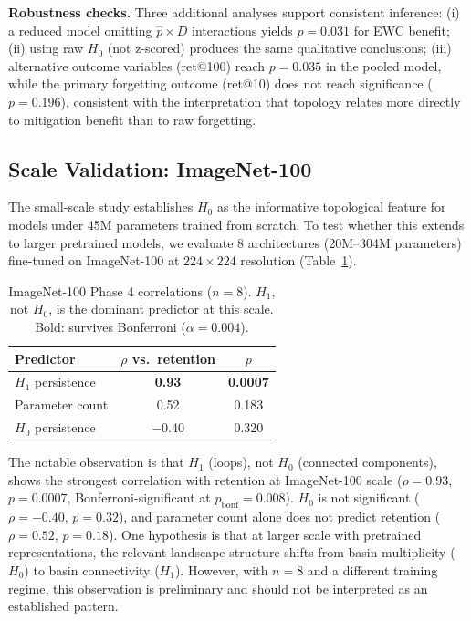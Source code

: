 \documentclass{article}
\begin{document}
\textbf{Robustness checks.} Three additional analyses support consistent inference: (i) a reduced model omitting $\hat{p} \times D$ interactions yields $p = 0.031$ for EWC benefit; (ii) using raw $H_0$ (not z-scored) produces the same qualitative conclusions; (iii) alternative outcome variables (ret@100) reach $p = 0.035$ in the pooled model, while the primary forgetting outcome (ret@10) does not reach significance ($p = 0.196$), consistent with the interpretation that topology relates more directly to mitigation benefit than to raw forgetting.

\subsection{Scale Validation: ImageNet-100}
\label{sec:scale}

The small-scale study establishes $H_0$ as the informative topological feature for models under 45M parameters trained from scratch. To test whether this extends to larger pretrained models, we evaluate 8 architectures (20M--304M parameters) fine-tuned on ImageNet-100 at $224 \times 224$ resolution (Table~\ref{tab:imagenet}).

\begin{table}[t]
\centering
\caption{ImageNet-100 Phase 4 correlations ($n = 8$). $H_1$, not $H_0$, is the dominant predictor at this scale. Bold: survives Bonferroni ($\alpha = 0.004$).}
\label{tab:imagenet}
\small
\begin{tabular}{@{}lcc@{}}
\toprule
Predictor & $\rho$ vs.\ retention & $p$ \\
\midrule
$H_1$ persistence & \textbf{0.93} & \textbf{0.0007} \\
Parameter count    & 0.52 & 0.183 \\
$H_0$ persistence  & $-$0.40 & 0.320 \\
\bottomrule
\end{tabular}
\end{table}

The notable observation is that $H_1$ (loops), not $H_0$ (connected components), shows the strongest correlation with retention at ImageNet-100 scale ($\rho = 0.93$, $p = 0.0007$, Bonferroni-significant at $p_{\text{bonf}} = 0.008$). $H_0$ is not significant ($\rho = -0.40$, $p = 0.32$), and parameter count alone does not predict retention ($\rho = 0.52$, $p = 0.18$). One hypothesis is that at larger scale with pretrained representations, the relevant landscape structure shifts from basin multiplicity ($H_0$) to basin connectivity ($H_1$). However, with $n = 8$ and a different training regime, this observation is preliminary and should not be interpreted as an established pattern.
\end{document}
